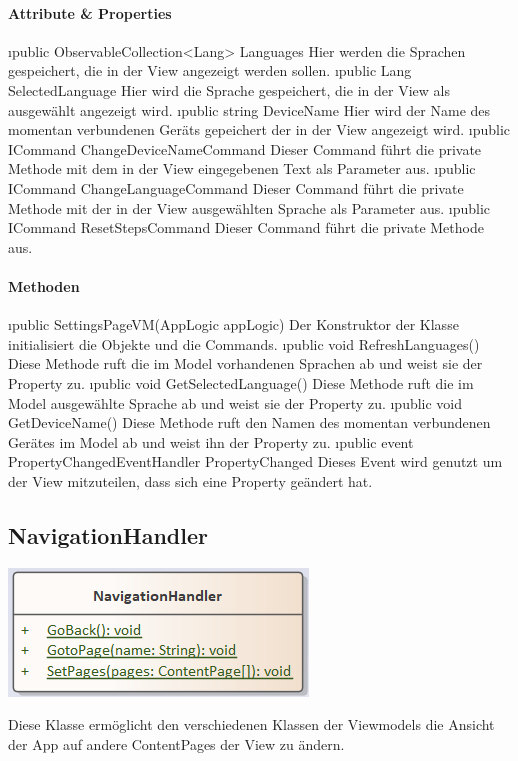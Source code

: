 \documentclass[../entwurf.tex]{subfiles}
\begin{document}
\paragraph{Attribute \& Properties}
\begin{itemize} 
	\i{public ObservableCollection<Lang> Languages} Hier werden die Sprachen gespeichert, die in der View angezeigt werden sollen.
	\i{public Lang SelectedLanguage} Hier wird die Sprache gespeichert, die in der View als ausgewählt angezeigt wird.
	\i{public string DeviceName} Hier wird der Name des momentan verbundenen Geräts gepeichert der in der View angezeigt wird.
	\i{public ICommand ChangeDeviceNameCommand} Dieser Command führt die private Methode  mit dem in der View eingegebenen Text als Parameter aus. 
	\i{public ICommand ChangeLanguageCommand} Dieser Command führt die private Methode  mit der in der View ausgewählten Sprache als Parameter aus. 
	\i{public ICommand ResetStepsCommand} Dieser Command führt die private Methode  aus. 
\end{itemize}
\paragraph{Methoden}
\begin{itemize}
	\i{public SettingsPageVM(AppLogic appLogic)} Der Konstruktor der Klasse initialisiert die Objekte  und die Commands.
	\i{public void RefreshLanguages()} Diese Methode ruft die im Model vorhandenen Sprachen ab und weist sie der Property  zu.
	\i{public void GetSelectedLanguage()} Diese Methode ruft die im Model ausgewählte Sprache ab und weist sie der Property  zu.
	\i{public void GetDeviceName()} Diese Methode ruft den Namen des momentan verbundenen Gerätes im Model ab und weist ihn der Property  zu.
	\i{public event PropertyChangedEventHandler PropertyChanged} Dieses Event wird genutzt um der View mitzuteilen, dass sich eine Property geändert hat.
\end{itemize}
\subsection{NavigationHandler}
\begin{minipage}{0.55\textwidth}
\includegraphics[scale=0.75]{../graphics/vm_klassen/NavigationHandler.png}
\end{minipage}
\begin{minipage}{0.45\textwidth}
Diese Klasse ermöglicht den verschiedenen Klassen der Viewmodels die Ansicht der App auf andere ContentPages der View zu ändern.
\end{minipage}
\end{document}

